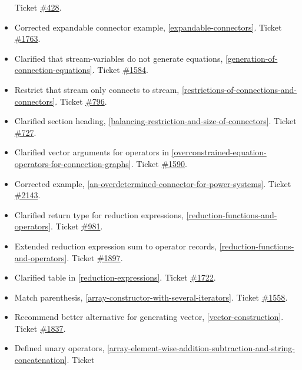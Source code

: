 \begin{itemize}
  Ticket \href{https://github.com/modelica/ModelicaSpecification/issues/428}{\#428}.
\item
  Corrected expandable connector example, \autoref{expandable-connectors}. Ticket
  \href{https://github.com/modelica/ModelicaSpecification/issues/1763}{\#1763}.
\item
  Clarified that stream-variables do not generate equations, \autoref{generation-of-connection-equations}. Ticket
  \href{https://github.com/modelica/ModelicaSpecification/issues/1584}{\#1584}.
\item
  Restrict that stream only connects to stream, \autoref{restrictions-of-connections-and-connectors}. Ticket
  \href{https://github.com/modelica/ModelicaSpecification/issues/796}{\#796}.
\item
  Clarified section heading, \autoref{balancing-restriction-and-size-of-connectors}. Ticket
  \href{https://github.com/modelica/ModelicaSpecification/issues/727}{\#727}.
\item
  Clarified vector arguments for operators in \autoref{overconstrained-equation-operators-for-connection-graphs}. Ticket
  \href{https://github.com/modelica/ModelicaSpecification/issues/1590}{\#1590}.
\item
  Corrected example, \autoref{an-overdetermined-connector-for-power-systems}. Ticket
  \href{https://github.com/modelica/ModelicaSpecification/issues/2143}{\#2143}.
\item
  Clarified return type for reduction expressions, \autoref{reduction-functions-and-operators}.
  Ticket \href{https://github.com/modelica/ModelicaSpecification/issues/981}{\#981}.
\item
  Extended reduction expression sum to operator records, \autoref{reduction-functions-and-operators}.
  Ticket \href{https://github.com/modelica/ModelicaSpecification/issues/1897}{\#1897}.
\item
  Clarified table in \autoref{reduction-expressions}. Ticket
  \href{https://github.com/modelica/ModelicaSpecification/issues/1722}{\#1722}.
\item
  Match parenthesis, \autoref{array-constructor-with-several-iterators}. Ticket
  \href{https://github.com/modelica/ModelicaSpecification/issues/1558}{\#1558}.
\item
  Recommend better alternative for generating vector, \autoref{vector-construction}.
  Ticket \href{https://github.com/modelica/ModelicaSpecification/issues/1837}{\#1837}.
\item
  Defined unary operators, \autoref{array-element-wise-addition-subtraction-and-string-concatenation}. Ticket

\end{itemize}
